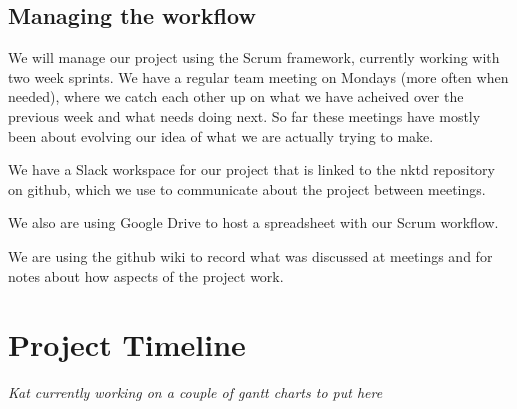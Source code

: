 \documentclass[11pt, oneside]{article}
\begin{document}
\subsection*{Managing the workflow}

We will manage our project using the Scrum framework, currently
working with two week sprints. We have a regular team meeting on
Mondays (more often when needed), where we catch each other up on what
we have acheived over the previous week and what needs doing next. So
far these meetings have mostly been about evolving our idea of what we
are actually trying to make.

We have a Slack workspace for our project that is linked to the nktd
repository on github, which we use to communicate about the project
between meetings.

We also are using Google Drive to host a spreadsheet with our Scrum
workflow.

We are using the github wiki to record what was discussed at meetings
and for notes about how aspects of the project work.


\section*{Project Timeline}

{\em Kat currently working on a couple of gantt charts to put here}




%
%
\end{document}
